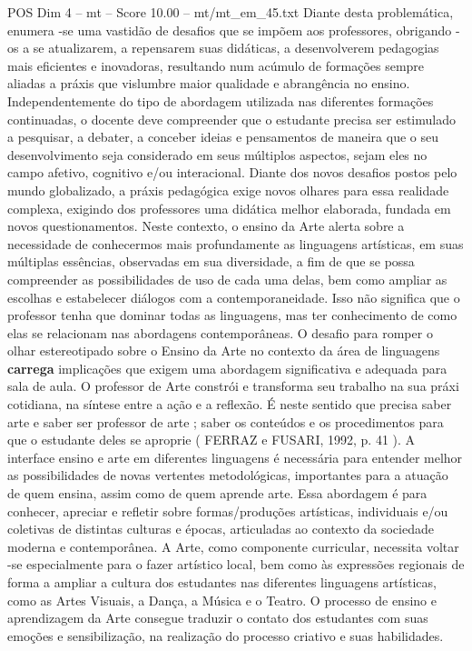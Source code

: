 \begin{textsample}{POS Dim 4 – mt – Score 10.00 – mt/mt\_em\_45.txt}
Diante desta problemática, enumera -se uma vastidão de desafios que se impõem aos professores, obrigando -os a se atualizarem, a repensarem suas didáticas, a desenvolverem pedagogias mais eficientes e inovadoras, resultando num acúmulo de formações sempre aliadas a práxis que vislumbre maior qualidade e abrangência no ensino.
Independentemente do tipo de abordagem utilizada nas diferentes formações continuadas, o docente deve compreender que o estudante precisa ser estimulado a pesquisar, a debater, a conceber ideias e pensamentos de maneira que o seu desenvolvimento seja considerado em seus múltiplos aspectos, sejam eles no campo afetivo, cognitivo e/ou interacional.
Diante dos novos desafios postos pelo mundo globalizado, a práxis pedagógica exige novos olhares para essa realidade complexa, exigindo dos professores uma didática melhor elaborada, fundada em novos questionamentos.
Neste contexto, o ensino da Arte alerta sobre a necessidade de conhecermos mais profundamente as linguagens artísticas, em suas múltiplas essências, observadas em sua diversidade, a fim de que se possa compreender as possibilidades de uso de cada uma delas, bem como ampliar as escolhas e estabelecer diálogos com a contemporaneidade.
Isso não significa que o professor tenha que dominar todas as linguagens, mas ter conhecimento de como elas se relacionam nas abordagens contemporâneas.
O desafio para romper o olhar estereotipado sobre o Ensino da Arte no contexto da área de linguagens \textbf{carrega} implicações que exigem uma abordagem significativa e adequada para sala de aula.
O professor de Arte constrói e transforma seu trabalho na sua práxi cotidiana, na síntese entre a ação e a reflexão.
É neste sentido que precisa saber arte e saber ser professor de arte ; saber os conteúdos e os procedimentos para que o estudante deles se aproprie ( FERRAZ e FUSARI, 1992, p. 41 ).
A interface ensino e arte em diferentes linguagens é necessária para entender melhor as possibilidades de novas vertentes metodológicas, importantes para a atuação de quem ensina, assim como de quem aprende arte.
Essa abordagem é para conhecer, apreciar e refletir sobre formas/produções artísticas, individuais e/ou coletivas de distintas culturas e épocas, articuladas ao contexto da sociedade moderna e contemporânea.
A Arte, como componente curricular, necessita voltar -se especialmente para o fazer artístico local, bem como às expressões regionais de forma a ampliar a cultura dos estudantes nas diferentes linguagens artísticas, como as Artes Visuais, a Dança, a Música e o Teatro.
O processo de ensino e aprendizagem da Arte consegue traduzir o contato dos estudantes com suas emoções e sensibilização, na realização do processo criativo e suas habilidades.

\end{textsample}
